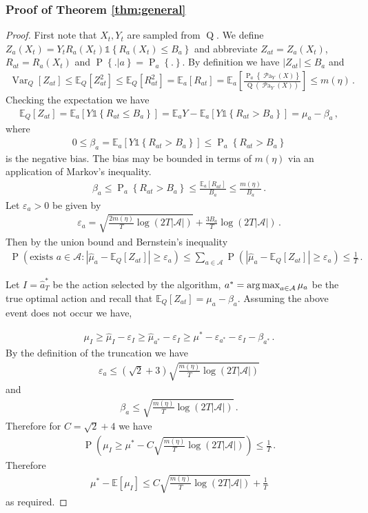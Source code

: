 \documentclass[11pt,a4paper,oneside]{book}
\newcommand{\Q}[1]{\operatorname{Q}\left(#1\right)}
\newcommand{\EE}{\mathbb E}
\newcommand{\EEa}{\EE_a}
\newcommand{\Pns}[2]{\operatorname{P}_{#1}\left\{#2\right\}}
\newcommand{\Pn}[2]{\operatorname{P}\left\{#2|#1\right\}}
\newcommand{\calA}{\mathcal A}
\newcommand{\Var}{\operatorname{Var}}
\newcommand{\set}[1]{\left\{#1\right\}}
\newcommand{\ind}[1]{\mathds{1}\!\!\set{#1}}
\newcommand{\argmax}{\operatornamewithlimits{arg\,max}}
\newcommand{\eq}[1]{\begin{align*}#1\end{align*}}
\renewcommand{\P}[1]{\operatorname{P}\left(#1\right)}
\newcommand{\parents}[1]{\operatorname{\mathcal{P}a}_{#1}}
\theoremstyle{plain}
\theoremstyle{definition}
\let\epsilon\varepsilon
\begin{document}
\subsubsection{Proof of Theorem \ref{thm:general}}\label{sec:thm:general}

\begin{proof}
First note that $X_t, Y_t$ are sampled from $\operatorname{Q}$.
We define $Z_a(X_t) = Y_t R_a(X_t)\ind{R_a(X_t)\leq B_a}$ and abbreviate $Z_{at} = Z_a(X_t)$, $R_{at} = R_a(X_t)$ and $\Pn{a}{.} = \Pns{a}{.}$.
By definition we have $|Z_{at}| \leq B_a$ and 
\eq{
\Var_Q[Z_{at}] 
\leq \EE_Q[Z_{at}^2] 
\leq \EE_Q[R_{at}^2]
= \EEa[R_{at}]
= \EEa\left[\frac{\Pns{a}{\parents{Y}(X)}}{\Q{\parents{Y}(X)}}\right] 
\leq m(\eta)\,.
}
Checking the expectation we have
\eq{
\EE_Q[Z_{at}] 
= \EEa \left[Y \ind{R_{at} \leq B_a}\right] 
= \EEa Y - \EEa \left[Y\ind{R_{at} > B_a}\right] 
= \mu_a - \beta_a\,,
}
where 
\eq{
0 \leq \beta_a = \EEa[Y \ind{R_{at} > B_a}] \leq \Pns{a}{R_{at} > B_a}
}
is the negative bias. 
The bias may be bounded in terms of $m(\eta)$ via an application of Markov's inequality.
\eq{
\beta_a \leq \Pns{a}{R_{at} > B_a} \leq \frac{\EEa[R_{at}]}{B_a} \leq \frac{m(\eta)}{B_a}\,.
}
Let $\epsilon_a > 0$ be given by
\eq{
\epsilon_a = \sqrt{\frac{2m(\eta)}{T} \log\left(2T|\calA|\right)} + \frac{3B_a}{T} \log\left(2T|\calA|\right)\,.
}
Then by the union bound and Bernstein's inequality 
\eq{
\P{\text{exists } a \in \calA : \left|\hat \mu_a - \EE_Q[Z_{at}]\right| \geq \epsilon_a} 
\leq \sum_{a \in \calA} \P{\left|\hat \mu_a - \EE_Q[Z_{at}]\right| \geq \epsilon_a} \leq \frac{1}{T}\,.
}

Let $I = \hat{a}^*_T$ be the action selected by the algorithm, $a^* = \argmax_{a \in \calA} \mu_a$ be the true optimal action and recall that $\EE_Q[Z_{at}] = \mu_a - \beta_a$. Assuming the above event does not occur we have,

\eq{
\mu_I \geq \hat \mu_I - \epsilon_I  
\geq \hat \mu_{a^*} - \epsilon_I  
\geq \mu^* - \epsilon_{a^*} - \epsilon_I - \beta_{a^*}\,. 
}
By the definition of the truncation
we have
\eq{
\epsilon_a \leq \left(\sqrt{2} + 3\right)\sqrt{\frac{m(\eta)}{T} \log\left(2T|\calA|\right)}
}
and
\eq{
\beta_a \leq \sqrt{\frac{m(\eta)}{T} \log\left(2T|\calA|\right)}\,. 
}
Therefore for $C = \sqrt{2} + 4$ we have
\eq{
\P{\mu_I \geq \mu^* - C \sqrt{\frac{m(\eta)}{T} \log\left(2T|\calA|\right)}} \leq \frac{1}{T}\,.
}
Therefore
\eq{
\mu^* - \EE[\mu_I] \leq C \sqrt{\frac{m(\eta)}{T} \log\left(2T|\calA|\right)} + \frac{1}{T}
}
as required.
\end{proof}
\end{document}
